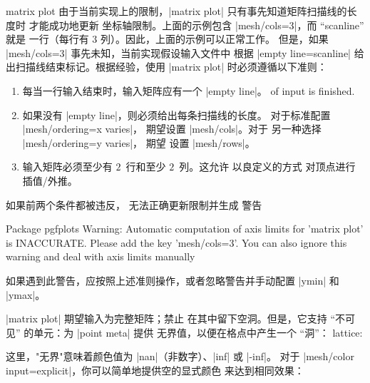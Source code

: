 {\begin{plottype}[/pgfplots]{matrix plot}
        由于当前实现上的限制，|matrix plot| 只有事先知道矩阵扫描线的长度时
        才能成功地更新
        坐标轴限制。上面的示例包含 |mesh/cols=3|，而 ``scanline'' 就是
        一行（每行有 $3$ 列）。因此，上面的示例可以正常工作。
    但是，如果 |mesh/cols=3| 事先未知，当前实现假设输入文件中
    根据 |empty line=scanline| 给出扫描线结束标记。根据经验，使用
    |matrix plot| 时必须遵循以下准则：
    \begin{enumerate}
            \item 每当一行输入结束时，输入矩阵应有一个 |empty line|。
            of input is finished.
            \item 如果没有 |empty line|，则必须给出每条扫描线的长度。
                对于标准配置
                |mesh/ordering=x varies|，\PGFPlots{} 期望设置 |mesh/cols|。对于
                另一种选择 |mesh/ordering=y varies|，\PGFPlots{} 期望
                设置 |mesh/rows|。
            \item 输入矩阵必须至少有 $2$~行和至少
                $2$~列。这允许 \PGFPlots{} 以良定义的方式
                对顶点进行插值/外推。
    \end{enumerate}
    如果前两个条件都被违反，\PGFPlots{} 无法正确更新限制并生成
    警告
\begin{codeexample}
Package pgfplots Warning: Automatic computation of axis limits for 'matrix plot' is INACCURATE.
Please add the key 'mesh/cols=3'. You can also ignore this warning and deal with axis limits manually
\end{codeexample}
    如果遇到此警告，应按照上述准则操作，或者忽略警告并手动配置
    |ymin| 和 |ymax|。

    |matrix plot| 期望输入为完整矩阵；禁止
        在其中留下空洞。但是，它支持 ``不可见'' 的单元：为 |point meta| 提供
        无界值，以便在格点中产生一个 ``洞''：
    lattice:
\begin{codeexample}[]
\end{codeexample}
    这里，"无界"意味着颜色值为 |nan|（非数字）、|inf| 或 |-inf|。
    对于 |mesh/color input=explicit|，你可以简单地提供空的显式颜色
    来达到相同效果：
\begin{codeexample}[]
\end{codeexample}
\end{plottype}}
